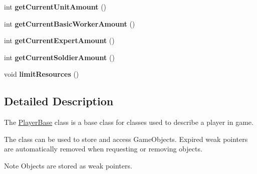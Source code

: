 \begin{DoxyCompactItemize}
\item 
\hypertarget{class_course_1_1_player_base_a504a0b9edc8ca0f1de43046b50dff9bb}{int {\bfseries get\-Current\-Unit\-Amount} ()}\label{class_course_1_1_player_base_a504a0b9edc8ca0f1de43046b50dff9bb}

\item 
\hypertarget{class_course_1_1_player_base_aaf74b7dc66fd49e88b6c341c249aeb3c}{int {\bfseries get\-Current\-Basic\-Worker\-Amount} ()}\label{class_course_1_1_player_base_aaf74b7dc66fd49e88b6c341c249aeb3c}

\item 
\hypertarget{class_course_1_1_player_base_a92efb6e834b678c25178efa04505e1b4}{int {\bfseries get\-Current\-Expert\-Amount} ()}\label{class_course_1_1_player_base_a92efb6e834b678c25178efa04505e1b4}

\item 
\hypertarget{class_course_1_1_player_base_aa1e8baef0dc737cca25c19a3618fa3a2}{int {\bfseries get\-Current\-Soldier\-Amount} ()}\label{class_course_1_1_player_base_aa1e8baef0dc737cca25c19a3618fa3a2}

\item 
\hypertarget{class_course_1_1_player_base_a0a818a518121d51457a27fcb62affb8c}{void {\bfseries limit\-Resources} ()}\label{class_course_1_1_player_base_a0a818a518121d51457a27fcb62affb8c}

\end{DoxyCompactItemize}


\subsection{Detailed Description}
The \hyperlink{class_course_1_1_player_base}{Player\-Base} class is a base class for classes used to describe a player in game. 

The class can be used to store and access Game\-Objects. Expired weak pointers are automatically removed when requesting or removing objects.

\begin{DoxyNote}{Note}
Objects are stored as weak pointers. 
\end{DoxyNote}


